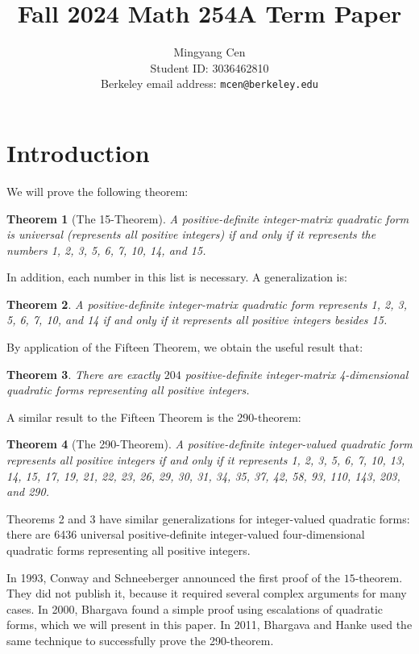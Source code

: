\documentclass{article}
\title{Fall 2024 Math 254A Term Paper}
\author{Mingyang Cen \\ Student ID: 3036462810 \\ Berkeley email address: \texttt{mcen@berkeley.edu}}
\newtheorem{thm}{Theorem}
\begin{document}
\maketitle

\section{Introduction}
We will prove the following theorem:
\begin{thm}[The 15-Theorem]\label{15thm}
    A positive-definite integer-matrix quadratic form is universal (represents all positive integers) if and only if it represents the numbers 1, 2, 3, 5, 6, 7, 10, 14, and 15.
\end{thm}
In addition, each number in this list is necessary.
A generalization is:
\begin{thm}\label{15thmgeneral}
    A positive-definite integer-matrix quadratic form represents 1, 2, 3, 5, 6, 7, 10, and 14 if and only if it represents all positive integers besides 15.
\end{thm}
By application of the Fifteen Theorem, we obtain the useful result that:
\begin{thm}\label{universal 4d}
    There are exactly $204$ positive-definite integer-matrix 4-dimensional quadratic forms representing all positive integers.
\end{thm}
A similar result to the Fifteen Theorem is the 290-theorem:
\begin{thm}[The 290-Theorem]
    A positive-definite integer-valued quadratic form represents all positive integers if and only if it represents 1, 2, 3, 5, 6, 7, 10, 13, 14, 15, 17, 19, 21, 22, 23, 26, 29, 30, 31, 34, 35, 37, 42, 58, 93, 110, 143, 203, and 290.
\end{thm}
Theorems 2 and 3 have similar generalizations for integer-valued quadratic forms: there are 6436 universal positive-definite integer-valued four-dimensional quadratic forms representing all positive integers.

In 1993, Conway and Schneeberger announced the first proof of the $15$-theorem. They did not publish it, because it required several complex arguments for many cases. In 2000, Bhargava \cite{fifteen} found a simple proof using escalations of quadratic forms, which we will present in this paper. In 2011, Bhargava and Hanke \cite{twoninety} used the same technique to successfully prove the 290-theorem.
\end{document}
